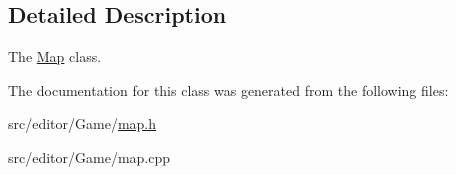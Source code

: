 \subsection{\-Detailed \-Description}
\-The \hyperlink{class_map}{\-Map} class. 

\-The documentation for this class was generated from the following files\-:\begin{DoxyCompactItemize}
\item 
src/editor/\-Game/\hyperlink{map_8h}{map.\-h}\item 
src/editor/\-Game/map.\-cpp\end{DoxyCompactItemize}

